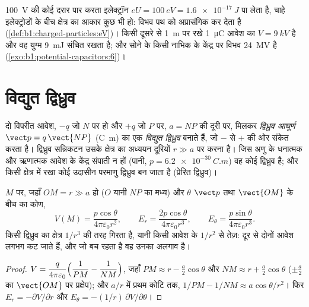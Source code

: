 \begin{example}[इलेक्ट्रॉन-वोल्ट, फिर से]\label{ex:b1:potential-capacitors:eV}
\qty{100}{V} की कोई दरार पार करता इलेक्ट्रॉन $eU = \qty{100}{eV} =
\qty{1.6e-17}{J}$ पा लेता है, चाहे इलेक्ट्रोडों के बीच क्षेत्र का आकार कुछ
भी हो: विभव पथ को अप्रासंगिक कर देता है
(\cref{def:b1:charged-particles:eV})। किसी दूसरे से \qty{1}{m} पर रखे
\qty{1}{\micro C} आवेश का $V = \qty{9}{kV}$ है और वह युग्म
\qty{9}{mJ} संचित रखता है; और सोने के किसी नाभिक के केंद्र पर विभव
\qty{24}{MV} है (\cref{exo:b1:potential-capacitors:6})।
\end{example}

\section{विद्युत द्विध्रुव}

\begin{definition}[विद्युत द्विध्रुव]\label{def:b1:potential-capacitors:dipole}
दो विपरीत आवेश, $-q$ जो $N$ पर हो और $+q$ जो $P$ पर, $a = NP$ की दूरी पर,
मिलकर \emph{द्विध्रुव आघूर्ण}
$\vect p = q\,\vect{NP}$ (\unit{C.m}) का एक \emph{विद्युत द्विध्रुव} बनाते
हैं, जो $-$ से $+$ की ओर संकेत करता है। द्विध्रुव सन्निकटन उसके क्षेत्र का
अध्ययन दूरियों $r \gg a$ पर करना है। जिस अणु के धनात्मक और ऋणात्मक आवेश के
केंद्र संपाती न हों (पानी, $p = \qty{6.2e-30}{C.m}$) वह कोई द्विध्रुव है;
और किसी क्षेत्र में रखा कोई उदासीन परमाणु द्विध्रुव बन जाता है (प्रेरित
द्विध्रुव)।
\end{definition}

\begin{proposition}[किसी द्विध्रुव का क्षेत्र]\label{prop:b1:potential-capacitors:dipolefield}
$M$ पर, जहाँ $OM = r \gg a$ हो ($O$ यानी $NP$ का मध्य) और $\theta$
$\vect p$ तथा $\vect{OM}$ के बीच का कोण,
\[
V(M) = \frac{p\cos\theta}{4\pi\varepsilon_0 r^2}, \qquad
E_r = \frac{2p\cos\theta}{4\pi\varepsilon_0r^3}, \qquad
E_\theta = \frac{p\sin\theta}{4\pi\varepsilon_0r^3} .
\]
किसी द्विध्रुव का क्षेत्र $1/r^3$ की तरह गिरता है, यानी किसी आवेश के
$1/r^2$ से तेज़: दूर से दोनों आवेश लगभग कट जाते हैं, और जो बच रहता है वह
उनका अलगाव है।
\end{proposition}

\begin{proof}
$V = \dfrac{q}{4\pi\varepsilon_0}\Bigl(\dfrac1{PM} - \dfrac1{NM}\Bigr)$, जहाँ
$PM \approx r - \tfrac a2\cos\theta$ और $NM \approx r + \tfrac a2\cos\theta$
($\pm\tfrac a2$ का $\vect{OM}$ पर प्रक्षेप); और $a/r$ में प्रथम कोटि तक,
$1/PM - 1/NM \approx a\cos\theta/r^2$। फिर $E_r = -\partial V/\partial r$ और
$E_\theta = -(1/r)\,\partial V/\partial\theta$।
\end{proof}

